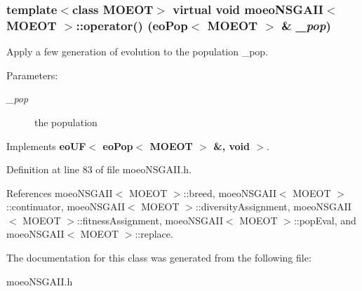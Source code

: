 \subsubsection{\setlength{\rightskip}{0pt plus 5cm}template$<$class MOEOT$>$ virtual void {\bf moeo\-NSGAII}$<$ MOEOT $>$::operator() ({\bf eo\-Pop}$<$ MOEOT $>$ \& {\em \_\-pop})\hspace{0.3cm}{\tt  [inline, virtual]}}\label{classmoeoNSGAII_60ba3ed4287efe81e1ff66b22e1d2e14}


Apply a few generation of evolution to the population \_\-pop. 

\begin{Desc}
\item[Parameters:]
\begin{description}
\item[{\em \_\-pop}]the population \end{description}
\end{Desc}


Implements {\bf eo\-UF$<$ eo\-Pop$<$ MOEOT $>$ \&, void $>$}.

Definition at line 83 of file moeo\-NSGAII.h.

References moeo\-NSGAII$<$ MOEOT $>$::breed, moeo\-NSGAII$<$ MOEOT $>$::continuator, moeo\-NSGAII$<$ MOEOT $>$::diversity\-Assignment, moeo\-NSGAII$<$ MOEOT $>$::fitness\-Assignment, moeo\-NSGAII$<$ MOEOT $>$::pop\-Eval, and moeo\-NSGAII$<$ MOEOT $>$::replace.

The documentation for this class was generated from the following file:\begin{CompactItemize}
\item 
moeo\-NSGAII.h\end{CompactItemize}
